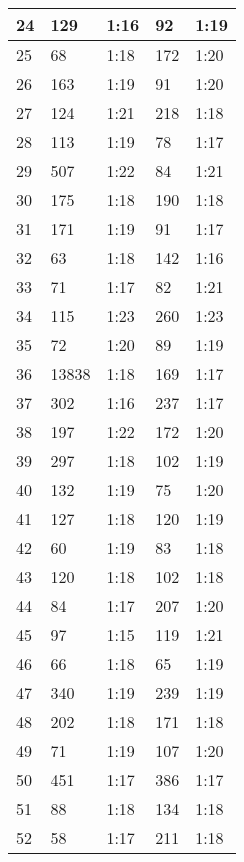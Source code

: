 \begin{center}
\begin{longtable}{|p{2cm}|l|l|l|l|}
24      & 129 	  & 1:16	&	92     & 1:19 \\ \hline
25      & 68  	  & 1:18	&	172    & 1:20 \\ \hline
26      & 163 	  & 1:19	&	91     & 1:20 \\ \hline
27      & 124 	  & 1:21	&	218    & 1:18 \\ \hline
28      & 113 	  & 1:19	&	78     & 1:17 \\ \hline
29      & 507 	  & 1:22	&	84     & 1:21 \\ \hline
30      & 175 	  & 1:18	&	190    & 1:18 \\ \hline
31      & 171 	  & 1:19	&	91     & 1:17 \\ \hline
32      & 63  	  & 1:18	&	142    & 1:16 \\ \hline
33      & 71  	  & 1:17	&	82     & 1:21 \\ \hline
34      & 115 	  & 1:23	&	260    & 1:23 \\ \hline
35      & 72  	  & 1:20	&	89     & 1:19 \\ \hline
36      & 13838	  & 1:18	&	169    & 1:17 \\ \hline
37      & 302 	  & 1:16	&	237    & 1:17 \\ \hline
38      & 197 	  & 1:22	&	172    & 1:20 \\ \hline
39      & 297 	  & 1:18	&	102    & 1:19 \\ \hline
40      & 132 	  & 1:19	&	75     & 1:20 \\ \hline
41      & 127 	  & 1:18	&	120    & 1:19 \\ \hline
42      & 60   	  & 1:19	&	83     & 1:18 \\ \hline
43      & 120 	  & 1:18	&	102    & 1:18 \\ \hline
44      & 84  	  & 1:17	&	207    & 1:20 \\ \hline
45      & 97  	  & 1:15	&	119    & 1:21 \\ \hline
46      & 66  	  & 1:18	&	65     & 1:19 \\ \hline
47      & 340 	  & 1:19	&	239    & 1:19 \\ \hline
48      & 202 	  & 1:18	&	171    & 1:18 \\ \hline
49      & 71  	  & 1:19	&	107    & 1:20 \\ \hline
50      & 451 	  & 1:17	&	386    & 1:17 \\ \hline
51      & 88  	  & 1:18	&	134    & 1:18 \\ \hline
52      & 58  	  & 1:17	&	211    & 1:18 \\ \hline

\end{longtable}
\end{center}
